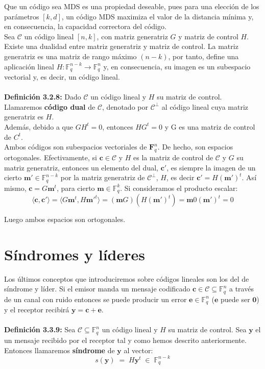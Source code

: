 \documentclass[11pt,spanish]{book}
\begin{document}
Que un código sea MDS es una propiedad deseable, pues para una elección de los parámetros $[k,d]$, un código MDS maximiza el valor de la distancia mínima y, en consecuencia, la capacidad correctora del código.\\

Sea $\mathcal{C}$ un código lineal $[n,k]$, con matriz generatriz $G$ y matriz de control $H$. Existe una dualidad entre matriz generatriz y matriz de control. La matriz generatriz es una matriz de rango máximo $(n-k)$, por tanto, define una aplicación lineal $H:\mathbb{F}_{q}^{n-k}\rightarrow \mathbb{F}_{q}^{n}$ y, en consecuencia, su imagen es un subespacio vectorial y, es decir, un código lineal.\\
\\ \hypertarget{codigodual}{\textbf{Definición 3.2.8: }}Dado $\mathcal{C}$ un código lineal y $H$ su matriz de control. Llamaremos \textbf{código dual} de $\mathcal{C}$, denotado por $\mathcal{C}^{\perp}$ al código lineal cuya matriz generatriz es $H$.\\

Además, debido a que $GH^{t} = 0$, entonces $HG^{t}=0$ y G es una matriz de control de $C^{t}$.\\

Ambos códigos son subespacios vectoriales de $\mathbf{F}_q^{n}$. De hecho, son espacios ortogonales. Efectivamente, si $\mathbf{c}\in \mathcal{C}$ y $H$ es la matriz de control de $\mathcal{C}$ y $G$ su matriz generatriz, entonces un elemento del dual, $\mathbf{c}'$, es siempre la imagen de un cierto $\mathbf{m'}\in \mathbb{F}^{n-k}_{q}$ por la matriz generatriz de $\mathcal{C}^{\perp}$, $H$, es decir $\mathbf{c}'=H(\mathbf{m'})^{t}$. Así mismo, $\mathbf{c}=G\mathbf{m}^{t}$, para cierto $\mathbf{m}\in \mathbb{F}^k_q$. Si consideramos el producto escalar:
$$\langle \mathbf{c}, \mathbf{c}'\rangle=\langle G\mathbf{m}^{t}, H\mathbf{m}'^{t} \rangle= (\mathbf{m}G)(H(\mathbf{m}')^{t})=\mathbf{m}0(\mathbf{m'})^{t}=0$$

Luego ambos espacios son ortogonales. 
\section{Síndromes y líderes}
Los últimos conceptos que introduciremos sobre códigos lineales son los del de síndrome y líder. Si el emisor manda un mensaje codificado $\mathbf{c}\in \mathcal{C}\subseteq\mathbb{F}_{q}^{n}$ a través de un canal con ruido entonces se puede producir un error $\mathbf{e}\in \mathbb{F}_{q}^{n}$ ($\mathbf{e}$ puede ser $\mathbf{0}$) y el receptor recibirá $\mathbf{y}=\mathbf{c}+\mathbf{e}$.\\
\\ \hypertarget{def3.3.9}{\textbf{Definición 3.3.9:}} Sea $\mathcal{C}\subseteq\mathbb{F}_q^{n}$ un código lineal y $H$ su matriz de control. Sea $\mathbf{y}$ el un mensaje recibido por el receptor tal y como hemos descrito anteriormente. Entonces llamaremos \textbf{síndrome} de $\mathbf{y}$ al vector:
$$s(\mathbf{y})\;=\;H\mathbf{y}^{t}\;\in\;\mathbb{F}_{q}^{n-k}$$
\end{document}

